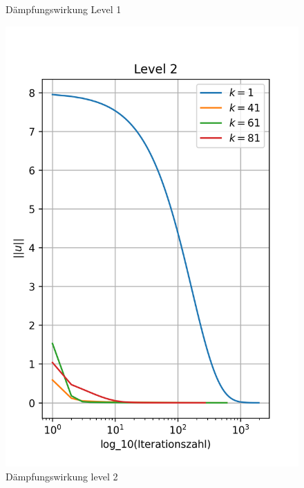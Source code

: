 \documentclass[11pt,a4paper]{article}
\begin{document}
\begin{figure}[htbp]
\begin{minipage}{0.45\linewidth}
        \caption[Level 1]{Dämpfungswirkung Level 1}\label{fig:h1_level1}
    \end{minipage}
     \hspace{0.5cm}
    \begin{minipage}{0.45\linewidth}
        \includegraphics[width=\linewidth,scale=0.7]{h1_level2}
        \caption[Level 2]{Dämpfungswirkung level 2}\label{fig:h1_level2}
    \end{minipage}
\end{figure}
\end{document}
